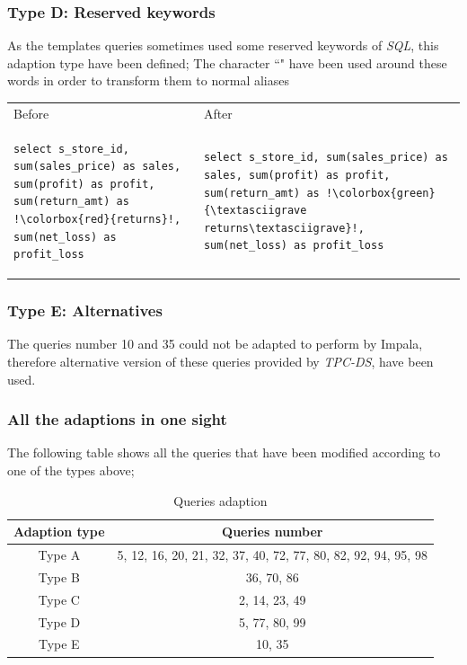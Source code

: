 \documentclass{article}
\newcommand\ita[1]{\textit{#1}}
\begin{document}
\subsubsection{Type D: Reserved keywords} 

As the templates queries sometimes used some reserved keywords of \ita{SQL}, this adaption type have been defined; The character ``\textasciigrave" have been used around these words in order to transform them to normal aliases

\begin{tabular}{p{8cm}|p{8cm}}

\hspace{3cm} Before & \hspace{3cm} After \\

\begin{lstlisting}[frame=none, escapechar=!]
select s_store_id, sum(sales_price) as sales, sum(profit) as profit, sum(return_amt) as !\colorbox{red}{returns}!, sum(net_loss) as profit_loss
\end{lstlisting}


&

\begin{lstlisting}[frame=none, escapechar=!]
select s_store_id, sum(sales_price) as sales, sum(profit) as profit, sum(return_amt) as !\colorbox{green}{\textasciigrave returns\textasciigrave}!, sum(net_loss) as profit_loss
\end{lstlisting} 

\end{tabular}


\subsubsection{Type E: Alternatives} 

The queries number 10 and 35 could not be adapted to perform by Impala, therefore alternative version of these queries provided by \ita{TPC-DS}, have been used.

\subsubsection{All the adaptions in one sight}

The following table shows all the queries that have been modified according to one of the types above;  
\begin{table}[H]
\centering
\begin{tabular}{|c|c|}
\hline
Adaption type & Queries number \\ \hline \hline
Type A &  5, 12, 16, 20, 21, 32, 37, 40, 72, 77, 80, 82, 92, 94, 95, 98 \\ \hline
Type B & 36, 70, 86 \\ \hline
Type C & 2, 14, 23, 49 \\ \hline
Type D & 5, 77, 80, 99 \\ \hline
Type E & 10, 35 \\ \hline
\end{tabular}
\caption{Queries adaption}
\label{table:Table 3}
\end{table}
\end{document}
